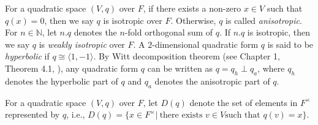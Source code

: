 \documentclass[sn-mathphys-num]{sn-jnl}%
\newtheorem{definition}[theorem]{Definition}
\begin{document}
\medskip

For a quadratic space $(V,q)$ over $F$, if there exists a non-zero $x \in V$ such that $q(x)=0$, then we say $q$ is isotropic over $F$. Otherwise, $q$ is called {\it anisotropic}. For $n \in \mathbb N$, let $n.q$ denotes the $n$-fold orthogonal sum of $q$. If $n.q$ is isotropic, then we say $q$ is {\it weakly isotropic} over $F$. A $2$-dimensional quadratic form $q$ is said to be {\it hyperbolic} if $q \cong \langle 1,-1 \rangle$. By Witt decomposition theorem (see Chapter 1, Theorem 4.1, \cite{lam}), any quadratic form $q$ can be written as $q=q_h \perp q_a$, where $q_h$ denotes the hyperbolic part of $q$ and $q_a$ denotes the anisotropic part of $q$.
\medskip 


 









For a quadratic space $(V,q)$ over $F$, let $D(q)$ denote the set of elements in $  F^\times$ represented by $q$, i.e.,
$D(q)=\{ x \in F^\times |\ \text{there exists } v \in V \text{such that }q(v)=x \}.$ 
\end{document}
